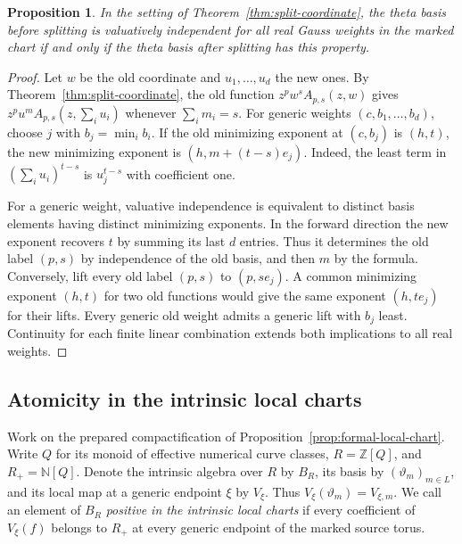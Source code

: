 \documentclass[11pt,reqno]{amsart}
\numberwithin{equation}{section}
\newtheorem{proposition}[theorem]{Proposition}
\theoremstyle{definition}
\theoremstyle{remark}
\begin{document}
\begin{proposition}\label{prop:split-vi}
In the setting of Theorem~\ref{thm:split-coordinate}, the theta basis before splitting is valuatively independent for all real Gauss weights in the marked chart if and only if the theta basis after splitting has this property.
\end{proposition}
\begin{proof}
Let \(w\) be the old coordinate and \(u_1,\ldots,u_d\) the new ones.
By Theorem~\ref{thm:split-coordinate}, the old function
\(z^pw^s A_{p,s}(z,w)\) gives \(z^p u^m A_{p,s}(z,\sum_i u_i)\)
whenever \(\sum_i m_i=s\). For generic weights \((c,b_1,\ldots,b_d)\),
choose \(j\) with \(b_j=\min_i b_i\). If the old minimizing exponent
at \((c,b_j)\) is \((h,t)\), the new minimizing exponent is
\((h,m+(t-s)e_j)\). Indeed, the least term in
\((\sum_i u_i)^{t-s}\) is \(u_j^{t-s}\) with coefficient one.

For a generic weight, valuative independence is equivalent to
distinct basis elements having distinct minimizing exponents. In
the forward direction the new exponent recovers \(t\) by summing
its last \(d\) entries. Thus it determines the old label \((p,s)\)
by independence of the old basis, and then \(m\) by the formula.
Conversely, lift every old label \((p,s)\) to \((p,se_j)\). A common
minimizing exponent \((h,t)\) for two old functions would give the
same exponent \((h,te_j)\) for their lifts. Every generic old weight
admits a generic lift with \(b_j\) least. Continuity for each finite
linear combination extends both implications to all real weights.
\end{proof}

\subsection{Atomicity in the intrinsic local charts}
\label{subsec:intrinsic-atomicity}

Work on the prepared compactification of
Proposition~\ref{prop:formal-local-chart}. Write \(Q\) for its monoid of
effective numerical curve classes, \(R=\mathbb Z[Q]\), and
\(R_+=\mathbb N[Q]\). Denote the intrinsic algebra over \(R\) by
\(B_R\), its basis by \((\vartheta_m)_{m\in L}\), and its local map at
a generic endpoint \(\xi\) by \(V_\xi\). Thus
\(V_\xi(\vartheta_m)=V_{\xi,m}\). We call an element of \(B_R\)
\emph{positive in the intrinsic local charts} if every coefficient of
\(V_\xi(f)\) belongs to \(R_+\) at every generic endpoint of the
marked source torus.
\end{document}
